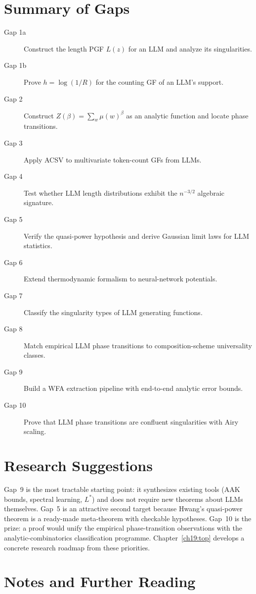 \section{Summary of Gaps}

\begin{description}
\item[Gap 1a] Construct the length PGF $L(z)$ for an LLM and analyze its singularities.
\item[Gap 1b] Prove $h=\log(1/R)$ for the counting GF of an LLM's support.
\item[Gap 2] Construct $Z(\beta)=\sum_w\mu(w)^\beta$ as an analytic function and locate phase transitions.
\item[Gap 3] Apply ACSV to multivariate token-count GFs from LLMs.
\item[Gap 4] Test whether LLM length distributions exhibit the $n^{-3/2}$ algebraic signature.
\item[Gap 5] Verify the quasi-power hypothesis and derive Gaussian limit laws for LLM statistics.
\item[Gap 6] Extend thermodynamic formalism to neural-network potentials.
\item[Gap 7] Classify the singularity types of LLM generating functions.
\item[Gap 8] Match empirical LLM phase transitions to composition-scheme universality classes.
\item[Gap 9] Build a WFA extraction pipeline with end-to-end analytic error bounds.
\item[Gap 10] Prove that LLM phase transitions are confluent singularities with Airy scaling.
\end{description}

\section{Research Suggestions}

Gap~9 is the most tractable starting point: it synthesizes existing tools (AAK bounds, spectral learning, $L^*$) and does not require new theorems about LLMs themselves. Gap~5 is an attractive second target because Hwang's quasi-power theorem is a ready-made meta-theorem with checkable hypotheses. Gap~10 is the prize: a proof would unify the empirical phase-transition observations with the analytic-combinatorics classification programme. Chapter~\ref{ch19:top} develops a concrete research roadmap from these priorities.

\section{Notes and Further Reading}

